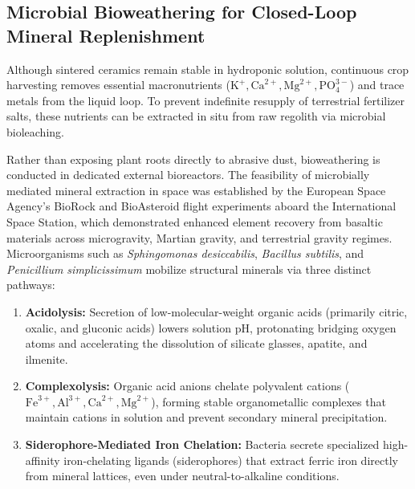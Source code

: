 \subsection{Microbial Bioweathering for Closed-Loop Mineral Replenishment}
\label{subsec:bioweathering}

Although sintered ceramics remain stable in hydroponic solution, continuous crop harvesting removes essential macronutrients ($\mathrm{K}^+, \mathrm{Ca}^{2+}, \mathrm{Mg}^{2+}, \mathrm{PO}_4^{3-}$) and trace metals from the liquid loop\cite{ming1989lunar,atkin2024bioremediation,cockell2018biorock}. To prevent indefinite resupply of terrestrial fertilizer salts, these nutrients can be extracted in situ from raw regolith via microbial bioleaching\cite{ming1989lunar,cockell2018biorock,santomartino2023toward}.

Rather than exposing plant roots directly to abrasive dust, bioweathering is conducted in dedicated external bioreactors\cite{ming1989lunar,cockell2018biorock}. The feasibility of microbially mediated mineral extraction in space was established by the European Space Agency's BioRock and BioAsteroid flight experiments aboard the International Space Station, which demonstrated enhanced element recovery from basaltic materials across microgravity, Martian gravity, and terrestrial gravity regimes\cite{cockell2018biorock,cockell2020microbially}. Microorganisms such as \textit{Sphingomonas desiccabilis}, \textit{Bacillus subtilis}, and \textit{Penicillium simplicissimum} mobilize structural minerals via three distinct pathways\cite{liao2025simulated,cockell2018biorock,santomartino2023toward}:
\begin{enumerate}
    \item \textbf{Acidolysis:} Secretion of low-molecular-weight organic acids (primarily citric, oxalic, and gluconic acids) lowers solution $\mathrm{pH}$, protonating bridging oxygen atoms and accelerating the dissolution of silicate glasses, apatite, and ilmenite\cite{liao2025simulated,cockell2018biorock,santomartino2023toward}.
    \item \textbf{Complexolysis:} Organic acid anions chelate polyvalent cations ($\mathrm{Fe}^{3+}, \mathrm{Al}^{3+}, \mathrm{Ca}^{2+}, \mathrm{Mg}^{2+}$), forming stable organometallic complexes that maintain cations in solution and prevent secondary mineral precipitation\cite{fateri2019solar}.
    \item \textbf{Siderophore-Mediated Iron Chelation:} Bacteria secrete specialized high-affinity iron-chelating ligands (siderophores) that extract ferric iron directly from mineral lattices, even under neutral-to-alkaline conditions\cite{cockell2018biorock,figueira2025biomining}.
\end{enumerate}

